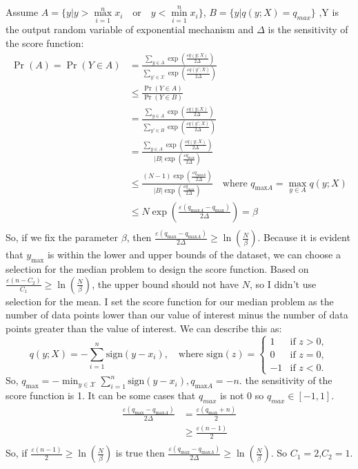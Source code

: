\documentclass[12pt]{extarticle}
\begin{document}
Assume $A = \{y|y>\underset{i=1}{\overset{n}{\max}} x_i \quad \text{or} \quad y<\underset{i=1}{\overset{n}{\min}} x_i\}$, $B = \{y|q(y;X)=q_{max}\}$ ,Y is the output random variable of exponential mechanism and \(\Delta\) is the sensitivity of the score function:
\begin{align*}
	\Pr(A) = \Pr(Y \in A) &= \frac{\sum_{y\in A}\exp\left(\frac{\varepsilon q(y;X)}{2\Delta}\right)}{\sum_{y'\in \mathcal{X}}\exp\left(\frac{\varepsilon q(y';X)}{2\Delta}\right)} \\
	&\le \frac{\Pr(Y \in A)}{\Pr(Y \in B)} \\
	&= \frac{\sum_{y\in A}\exp\left(\frac{\varepsilon q(y;X)}{2\Delta}\right)}{\sum_{y'\in B}\exp\left(\frac{\varepsilon q(y';X)}{2\Delta}\right)} \\
	&= \frac{\sum_{y\in A}\exp\left(\frac{\varepsilon q(y;X)}{2\Delta}\right)}{|B|\exp\left(\frac{\varepsilon q_{\text{max}}}{2\Delta}\right)} \\
	&\le \frac{(N-1)\exp\left(\frac{\varepsilon q_{\text{max}A}}{2\Delta}\right)}{|B|\exp\left(\frac{\varepsilon q_{\text{max}}}{2\Delta}\right)} \quad \text{where } q_{\text{max}A} = \max_{y \in A} q(y;X) \\
	&\le N\exp\left(\frac{\varepsilon (q_{\text{max}A}-q_{\text{max}})}{2\Delta}\right) = \beta \\
\end{align*}
So, if we fix the parameter \(\beta\), then \(\frac{\varepsilon (q_{\text{max}}-q_{\text{max}A})}{2\Delta} \ge \ln\left(\frac{N}{\beta}\right)\).
Because it is evident that \(y_{\text{max}}\) is within the lower and upper bounds of the dataset, we can choose a selection for the median problem to design the score function. Based on \(\frac{\varepsilon (n-C_2)}{C_1} \ge \ln\left(\frac{N}{\beta}\right)\), the upper bound should not have \(N\), so I didn't use selection for the mean. I set the score function for our median problem as the number of data points lower than our value of interest minus the number of data points greater than the value of interest. We can describe this as:
\[
q(y; X) = -\sum_{i=1}^{n} \text{sign}(y - x_i),
\quad \text{where } \text{sign}(z) =
\begin{cases}
	1 & \text{if } z > 0, \\
	0 & \text{if } z = 0, \\
	-1 & \text{if } z < 0.
\end{cases}
\]
So, \(q_{\text{max}} = -\min_{y \in \mathcal{X}} \sum_{i=1}^{n} \text{sign}(y - x_i), q_{\text{max}A} = -n\).
the sensitivity of the score function is 1. It can be some cases that \(q_{max}\) is not 0 so $q_{max}\in[-1,1]$. 
\begin{align*}
	 \frac{\varepsilon (q_{\text{max}}-q_{\text{max}A})}{2\Delta}
	 &=\frac{\varepsilon (q_{\text{max}}+n)}{2}\\ 
	 &\ge \frac{\varepsilon (n-1)}{2}\\
\end{align*}
So, if $\frac{\varepsilon (n-1)}{2}\ge \ln\left(\frac{N}{\beta}\right)$ is true then
$\frac{\varepsilon (q_{\text{max}}-q_{\text{max}A})}{2\Delta} \ge \ln\left(\frac{N}{\beta}\right)$. So \(C_1 = 2\),\(C_2 = 1\).
\end{document}
